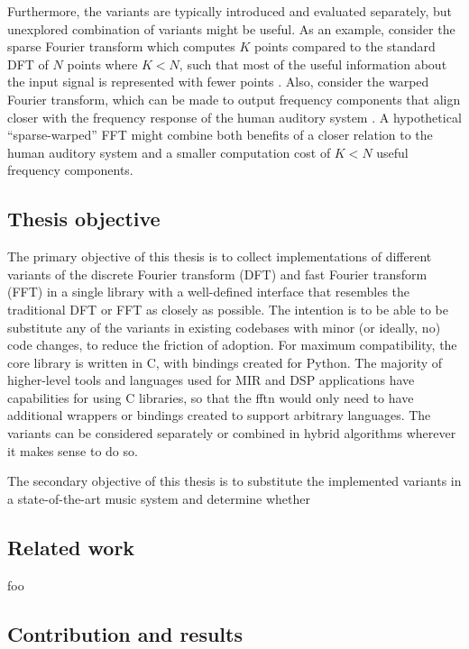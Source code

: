 \documentclass[letter,12pt,notitlepage]{article}
\begin{document}
Furthermore, the variants are typically introduced and evaluated separately, but unexplored combination of variants might be useful. As an example, consider the sparse Fourier transform which computes $K$ points compared to the standard DFT of $N$ points where $K < N$, such that most of the useful information about the input signal is represented with fewer points \cite{sparseintro}. Also, consider the warped Fourier transform, which can be made to output frequency components that align closer with the frequency response of the human auditory system \cite{warpedpsycho}. A hypothetical ``sparse-warped'' FFT might combine both benefits of a closer relation to the human auditory system and a smaller computation cost of $K < N$ useful frequency components.

\subsection{Thesis objective}

The primary objective of this thesis is to collect implementations of different variants of the discrete Fourier transform (DFT) and fast Fourier transform (FFT) in a single library with a well-defined interface that resembles the traditional DFT or FFT as closely as possible. The intention is to be able to be substitute any of the variants in existing codebases with minor (or ideally, no) code changes, to reduce the friction of adoption. For maximum compatibility, the core library is written in C, with bindings created for Python. The majority of higher-level tools and languages used for MIR and DSP applications have capabilities for using C libraries, so that the fftn would only need to have additional wrappers or bindings created to support arbitrary languages.  The variants can be considered separately or combined in hybrid algorithms wherever it makes sense to do so.

The secondary objective of this thesis is to substitute the implemented variants in a state-of-the-art music system and determine whether 

\subsection{Related work}

foo

\subsection{Contribution and results}
\end{document}
